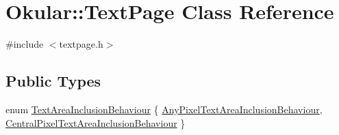 \hypertarget{classOkular_1_1TextPage}{\section{Okular\+:\+:Text\+Page Class Reference}
\label{classOkular_1_1TextPage}
}


{\ttfamily \#include $<$textpage.\+h$>$}

\subsection*{Public Types}
\begin{DoxyCompactItemize}
\item 
enum \hyperlink{classOkular_1_1TextPage_a07b135c84863f18df1d08e95aeeffd34}{Text\+Area\+Inclusion\+Behaviour} \{ \hyperlink{classOkular_1_1TextPage_a07b135c84863f18df1d08e95aeeffd34a37eee044832944a9f31f7a9d3d39e0dd}{Any\+Pixel\+Text\+Area\+Inclusion\+Behaviour}, 
\hyperlink{classOkular_1_1TextPage_a07b135c84863f18df1d08e95aeeffd34a8f4ca9fdbb6e543cd335d787bc80eabc}{Central\+Pixel\+Text\+Area\+Inclusion\+Behaviour}
 \}
\end{DoxyCompactItemize}
